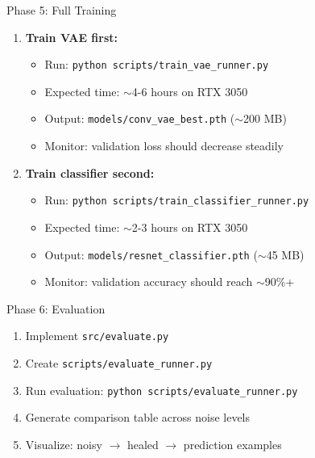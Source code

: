 \documentclass[11pt,a4paper]{article}
\begin{document}
\begin{conceptbox}{Phase 5: Full Training}
\begin{enumerate}[noitemsep]
    \item \textbf{Train VAE first:}
    \begin{itemize}[noitemsep]
        \item Run: \texttt{python scripts/train\_vae\_runner.py}
        \item Expected time: $\sim$4-6 hours on RTX 3050
        \item Output: \texttt{models/conv\_vae\_best.pth} ($\sim$200 MB)
        \item Monitor: validation loss should decrease steadily
    \end{itemize}
    \item \textbf{Train classifier second:}
    \begin{itemize}[noitemsep]
        \item Run: \texttt{python scripts/train\_classifier\_runner.py}
        \item Expected time: $\sim$2-3 hours on RTX 3050
        \item Output: \texttt{models/resnet\_classifier.pth} ($\sim$45 MB)
        \item Monitor: validation accuracy should reach $\sim$90\%+
    \end{itemize}
\end{enumerate}
\end{conceptbox}

\vspace{0.3cm}

\begin{conceptbox}{Phase 6: Evaluation}
\begin{enumerate}[noitemsep]
    \item Implement \texttt{src/evaluate.py}
    \item Create \texttt{scripts/evaluate\_runner.py}
    \item Run evaluation: \texttt{python scripts/evaluate\_runner.py}
    \item Generate comparison table across noise levels
    \item Visualize: noisy $\rightarrow$ healed $\rightarrow$ prediction examples
\end{enumerate}
\end{conceptbox}

\newpage

\end{document}
